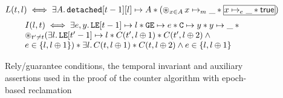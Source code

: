 \begin{figure}
{$$$$
$$
L(t, l) \iff \exists A.\, \rlist[t-1][l] \mapsto A * 
(\bigast\nolimits_{x \in A}   x \mapsto_m \_ * \shared{x \mapsto_e \_ * \true}) 
$$
$$
\begin{array}{@{}l@{}}
I(l, t)  \iff 
\exists e, y.\, \LE[t-1] \mapsto l * \GE \mapsto e * \cc \mapsto y * y \mapsto \_ *{}
\\
 \bigast\nolimits_{t' \not= t} (\exists l.\, 
\LE[t'-1] \mapsto l * C(t', l\oplus 1) * C(t', l\oplus 2) \wedge {}
\\
e \in \{l, l \oplus 1\})* 
\exists l.\, C(t, l\oplus 1) * C(t, l\oplus 2) \wedge e \in \{l, l \oplus 1\}
\end{array}
$$
}
\caption{\label{fig:act-epoch}\small Rely/guarantee conditions, the temporal invariant
  and auxiliary assertions used in the proof of the counter algorithm with
  epoch-based reclamation}
\end{figure}

